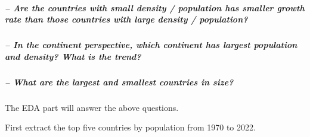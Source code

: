 \documentclass[
]{article}
\begin{document}
\hypertarget{are-the-countries-with-small-density-population-has-smaller-growth-rate-than-those-countries-with-large-density-population}{%
\subparagraph{-- Are the countries with small density / population has
smaller growth rate than those countries with large density /
population?}\label{are-the-countries-with-small-density-population-has-smaller-growth-rate-than-those-countries-with-large-density-population}}

\hypertarget{in-the-continent-perspective-which-continent-has-largest-population-and-density-what-is-the-trend}{%
\subparagraph{-- In the continent perspective, which continent has
largest population and density? What is the
trend?}\label{in-the-continent-perspective-which-continent-has-largest-population-and-density-what-is-the-trend}}

\hypertarget{what-are-the-largest-and-smallest-countries-in-size}{%
\subparagraph{-- What are the largest and smallest countries in
size?}\label{what-are-the-largest-and-smallest-countries-in-size}}

The EDA part will answer the above questions.

First extract the top five countries by population from 1970 to 2022.
\end{document}
